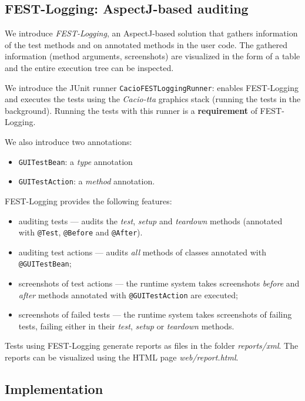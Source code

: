 \subsection{FEST-Logging: AspectJ-based auditing}

We introduce \emph{FEST-Logging}, an AspectJ-based solution that gathers information of the test methods and on annotated methods in the user code. The gathered information (method arguments, screenshots) are visualized in the form of a table and the entire execution tree can be inspected.

We introduce the JUnit runner \texttt{CacioFESTLoggingRunner}: enables FEST-Logging and executes the tests using the \emph{Cacio-tta} graphics stack (running the tests in the background). Running the tests with this runner is a \textbf{requirement} of FEST-Logging.

We also introduce two annotations:
\begin{itemize}
\item \texttt{GUITestBean}: a \emph{type} annotation
\item \texttt{GUITestAction}: a \emph{method} annotation.
\end{itemize}

FEST-Logging provides the following features:
\begin{itemize}
\item auditing tests --- audits the \emph{test}, \emph{setup} and \emph{teardown} methods (annotated with \texttt{@Test}, \texttt{@Before} and \texttt{@After}).
\item auditing test actions --- audits \emph{all} methods of classes annotated with \texttt{@GUITestBean};
\item screenshots of test actions --- the runtime system takes screenshots \emph{before} and \emph{after} methods annotated with \texttt{@GUITestAction} are executed;
\item screenshots of failed tests --- the runtime system takes screenshots of failing tests, failing either in their \emph{test}, \emph{setup} or \emph{teardown} methods. 
\end{itemize}

Tests using FEST-Logging generate reports as files in the folder \emph{reports/xml}. The reports can be visualized using the HTML page \emph{web/report.html}.

\subsection{Implementation}

